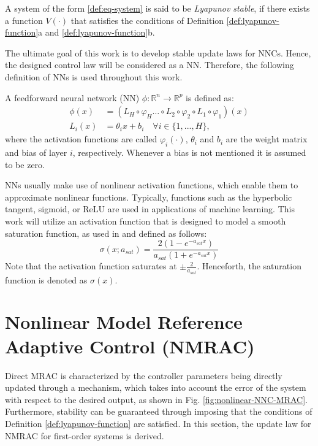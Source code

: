 \begin{definition}
    A system of the form \eqref{def:eq-system} is said to be \textit{Lyapunov stable}, if there exists a function $V(\cdot)$ that satisfies the conditions of Definition \ref{def:lyapunov-function}a and \ref{def:lyapunov-function}b.
    \label{def:lyapunov-stability}
\end{definition}

The ultimate goal of this work is to develop stable update laws for NNCs. Hence, the designed control law will be considered as a NN. Therefore, the following definition of NNs is used throughout this work.

\begin{definition}
 A feedforward neural network (NN) $\phi:\mathbb{R}^n\rightarrow \mathbb{R}^p$ is defined as:
\begin{equation}
 \begin{aligned}
 \phi (x) & = (L_{H} \circ \varphi_{H} \dots \circ L_{2} \circ \varphi_{2} \circ L_{1} \circ \varphi_1)(x)\\
 L_i(x) &= \theta_i x + b_i \quad \forall i\in\{1,..., H\},
\end{aligned}
\end{equation}
 where the activation functions are called $\varphi_i(\cdot)$, $\theta_i$ and $b_i$ are the weight matrix and bias of layer $i$, respectively. Whenever a bias is not mentioned it is assumed to be zero.
\end{definition}

NNs usually make use of nonlinear activation functions, which enable them to approximate nonlinear functions. Typically, functions such as the hyperbolic tangent, sigmoid, or ReLU are used in applications of machine learning. This work will utilize an activation function that is designed to model a smooth saturation function, as used in \cite{wahby_enhanced_2024, thanhNonlinearPIDControl2006} and defined as follows:
\begin{equation}
 \sigma (x;a_{sat}) = \frac{2(1-e^{-a_{sat}x})}{a_{sat}(1+e^{-a_{sat}x})}
 \label{eq:sigmoid}
\end{equation}
Note that the activation function saturates at $\pm \frac{2}{a_{sat}}$. Henceforth, the saturation function is denoted as $\sigma(x)$. 

\section{Nonlinear Model Reference Adaptive Control (NMRAC)}
\label{sec:NMRAC}
Direct MRAC is characterized by the controller parameters being directly updated through a mechanism, which takes into account the error of the system with respect to the desired output, as shown in Fig. \ref{fig:nonlinear-NNC-MRAC}. Furthermore, stability can be guaranteed through imposing that the conditions of Definition \ref{def:lyapunov-function} are satisfied. In this section, the update law for NMRAC for first-order systems is derived.

